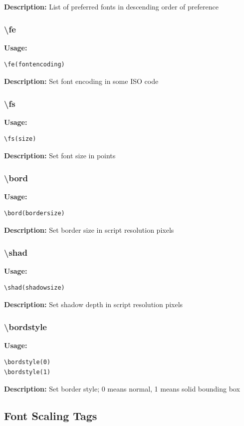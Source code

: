 \documentclass{spec}
\begin{document}
\textbf{Description:}
List of preferred fonts in descending order of preference

\subsubsection{\textbackslash fe}
\textbf{Usage:}
\begin{verbatim}
\fe(fontencoding)
\end{verbatim}

\textbf{Description:}
Set font encoding in some ISO code

\subsubsection{\textbackslash fs}
\textbf{Usage:}
\begin{verbatim}
\fs(size)
\end{verbatim}

\textbf{Description:}
Set font size in points

\subsubsection{\textbackslash bord}
\textbf{Usage:}
\begin{verbatim}
\bord(bordersize)
\end{verbatim}

\textbf{Description:}
Set border size in script resolution pixels

\subsubsection{\textbackslash shad}
\textbf{Usage:}
\begin{verbatim}
\shad(shadowsize)
\end{verbatim}

\textbf{Description:}
Set shadow depth in script resolution pixels

\subsubsection{\textbackslash bordstyle}
\textbf{Usage:}
\begin{verbatim}
\bordstyle(0)
\bordstyle(1)
\end{verbatim}

\textbf{Description:}
Set border style; 0 means normal, 1 means solid bounding box

\subsection{Font Scaling Tags}
\end{document}
